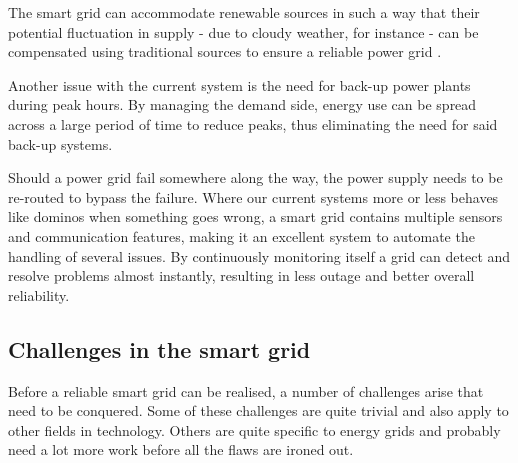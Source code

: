 
The smart grid can accommodate renewable sources in such a way that their potential fluctuation in supply - due to cloudy weather, for instance - can be compensated using traditional sources to ensure a reliable power grid . 

Another issue with the current system is the need for back-up power plants during peak hours. By managing the demand side, energy use can be spread across a large period of time to reduce peaks, thus eliminating the need for said back-up systems. 

Should a power grid fail somewhere along the way, the power supply needs to be re-routed to bypass the failure. Where our current systems more or less behaves like dominos when something goes wrong,  a smart grid contains multiple sensors and communication features, making it an excellent system to automate the handling of several issues. By continuously monitoring itself a grid can detect and resolve problems almost instantly, resulting in less outage and better overall reliability.


\subsection{Challenges in the smart grid}   
Before a reliable smart grid can be realised, a number of challenges arise that need to be conquered. Some of these challenges are quite trivial and also apply to other fields in technology. Others are quite specific to energy grids and probably need a lot more work before all the flaws are ironed out.
 
 
